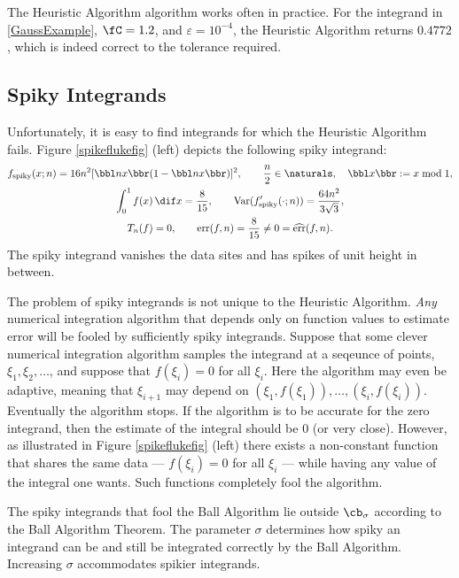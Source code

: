 \documentclass[]{article}
\DeclareMathOperator{\Var}{Var}
\DeclareMathOperator{\err}{err}
\newcommand{\herr}{\widehat{\err}}
\theoremstyle{definition}
\theoremstyle{remark}
\begin{document}
The Heuristic Algorithm algorithm works often in practice.  For the integrand in \eqref{GaussExample}, $\fC=1.2$, and $\varepsilon=10^{-4}$, the Heuristic Algorithm returns $0.4772$, which is indeed correct to the tolerance required.

\subsection{Spiky Integrands} 

Unfortunately, it is easy to find integrands for which the Heuristic Algorithm fails.  Figure \ref{spikeflukefig} (left) depicts the following spiky integrand:
\begin{subequations} \label{spiky}
\begin{gather} \label{spiky}
f_{\text{spiky}}(x;n) = 16n^2[\bbl nx \bbr(1-\bbl nx \bbr)]^2, \qquad \frac n2 \in \naturals, \quad \bbl x \bbr := x \bmod 1,\\
\int_0^1 f(x) \, \dif x = \frac{8}{15}, \qquad 
\Var(f'_{\text{spiky}}(\cdot;n))= \frac{64n^2}{3\sqrt{3}}, \\
T_n(f)=0, \qquad \err(f,n)= \frac{8}{15}\ne 0=\herr(f,n).
\end{gather}
\end{subequations}
The spiky integrand vanishes the data sites and has spikes of unit height in between.

The problem of spiky integrands is not unique to the Heuristic Algorithm.  \emph{Any} numerical integration algorithm that depends only on function values to estimate error will be fooled by sufficiently spiky integrands.  Suppose that some clever numerical integration algorithm samples the integrand at a seqeunce of points, $\xi_1, \xi_2, \ldots$, and suppose that $f(\xi_i)=0$ for all $\xi_i$.  Here the algorithm may even be adaptive, meaning that $\xi_{i+1}$ may depend on $(\xi_1, f(\xi_1)), \ldots, (\xi_i, f(\xi_i))$.  Eventually the algorithm stops.  If the algorithm is to be accurate for the zero integrand, then the estimate of the integral should be $0$ (or very close).  However, as illustrated in Figure \ref{spikeflukefig} (left) there exists a non-constant function that shares the same data --- $f(\xi_i)=0$ for all $\xi_i$ --- while having any value of the integral one wants. Such functions completely fool the algorithm.

The spiky integrands that fool the Ball Algorithm lie outside $\cb_{\sigma}$ according to  the Ball Algorithm Theorem.  The parameter $\sigma$ determines how spiky an integrand can be and still be integrated correctly by the Ball Algorithm.  Increasing $\sigma$ accommodates spikier integrands.  
\end{document}
